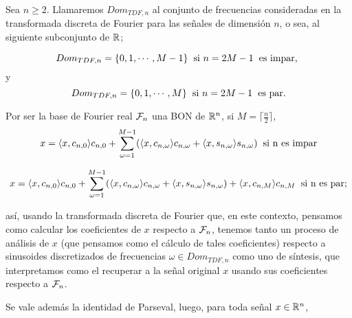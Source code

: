 \begin{defi}
\label{def. Dom tdf}
Sea $n \geq 2$. Llamaremos $Dom_{TDF, n}$ al conjunto de frecuencias
consideradas en la transformada discreta de Fourier para
las señales de dimensión $n$, o sea, al siguiente subconjunto de $\mathbb{R}$;

\[
Dom_{TDF, n} = \{ 0 , 1, \cdots, M-1 \}
\hspace{0.2cm} \text{si } n = 2M-1
\hspace{0.2cm}
\text{es impar, }
\]
y
\[
Dom_{TDF, n} = \{ 0 , 1, \cdots, M \}
\hspace{0.2cm} \text{si } n = 2M-1
\hspace{0.2cm}
\text{es par.}
\]
\end{defi}


\begin{nota}
\label{nota: ya?}
Por ser 
la base de Fourier real
$\mathcal{F}_{n}$ una BON de $\mathbb{R}^{n}$, 
si $M = \lceil \frac{n}{2} \rceil$,
\begin{equation}
\label{ec: sintesis 0}
x = \langle x , c_{n, 0} \rangle c_{n, 0} + \sum\limits_{\omega = 1}^{M-1}(
\langle x , c_{n, \omega} \rangle c_{n, \omega} + 
\langle x , s_{n, \omega} \rangle s_{n, \omega} )
\hspace{0.2cm} \text{si n es impar}
\end{equation}

\begin{equation}
\label{ec: sintesis 1}
x = \langle x , c_{n, 0} \rangle c_{n, 0} + \sum\limits_{\omega = 1}^{M-1}(
\langle x , c_{n, \omega} \rangle  c_{n, \omega} + \langle x , s_{n, \omega} \rangle
s_{n, \omega} )
+ \langle x , c_{n, M} \rangle c_{n, M} 
\hspace{0.2cm} \text{si n es par;}
\end{equation}

así, usando la transformada discreta de Fourier
que, en este contexto, pensamos como calcular
los coeficientes de $x$ respecto a $\mathcal{F}_{n}$, tenemos tanto
un proceso de análisis de $x$ (que pensamos como
el cálculo de tales coeficientes)
respecto a sinusoides discretizados
de frecuencias $\omega \in Dom_{TDF, n}$
como uno de síntesis, que interpretamos como
el recuperar a la señal original $x$ usando
sus coeficientes respecto a $\mathcal{F}_{n}$.
\end{nota}

Se vale además la
identidad de Parseval, luego, para toda
señal $x \in \mathbb{R}^{n}$,

